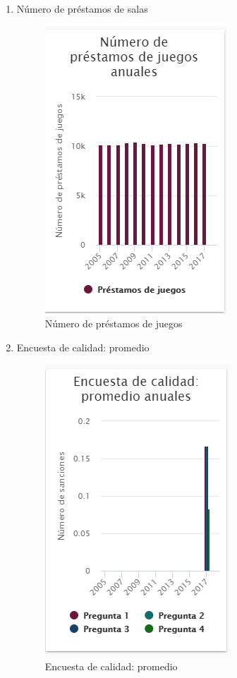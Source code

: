 \begin{itemize}
\begin{enumerate}
	\item Número de préstamos de salas
	\begin{figure}[hbtp]
	\includegraphics[scale=0.7]{images/InterfazMovil/IUGS15_juegosTodos.PNG}
	\caption{Número de préstamos de juegos}
	\end{figure}
	
	\item Encuesta de calidad: promedio
	\begin{figure}[hbtp]
	\includegraphics[scale=0.7]{images/InterfazMovil/IUGS15_encuestaCalidadTodos.PNG}
	\caption{Encuesta de calidad: promedio}
	\end{figure}
	

\end{enumerate}
\end{itemize}
